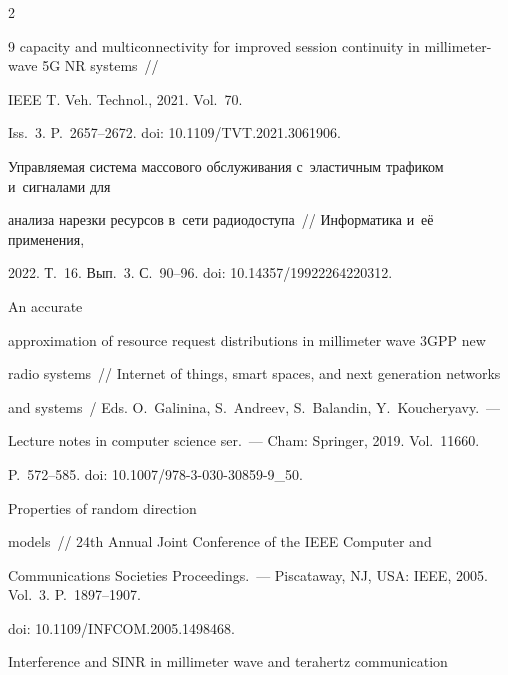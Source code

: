 \begin{multicols}{2}
{{\begin{thebibliography}{9}
capacity and multiconnectivity for improved session continuity in millimeter-wave 5G NR systems~// 

IEEE T. Veh. Technol., 2021. Vol.~70. 

Iss.~3. P.~2657--2672. doi: 10.1109/TVT.2021.3061906.





Управляемая сис\-те\-ма массового обслуживания с~элас\-тич\-ным трафиком и~сигналами для 

анализа нарезки ресурсов в~сети радиодоступа~// Информатика и~её применения, 

2022. Т.~16. Вып.~3. С.~90--96. doi: 10.14357/19922264220312.




 An accurate 

approximation of resource request distributions in millimeter wave 3GPP new 

radio systems~// Internet of things, smart spaces, and next generation networks 

and systems~/ Eds. O.~Galinina, S.~Andreev, S.~Balandin, Y.~Koucheryavy.~--- 

Lecture notes in computer science ser.~--- Cham: Springer, 2019. Vol.~11660. 

P.~572--585. doi: 10.1007/978-3-030-30859-9\_50.




 Properties of random direction 

models~//  24th Annual Joint Conference of the IEEE Computer and 

Communications Societies Proceedings.~--- Piscataway, NJ, USA: IEEE, 2005. Vol.~3. P.~1897--1907. 

doi: 10.1109/INFCOM.2005.1498468. 





\newblock Interference and SINR in millimeter wave and terahertz communication 


\end{thebibliography}}}
\end{multicols}

